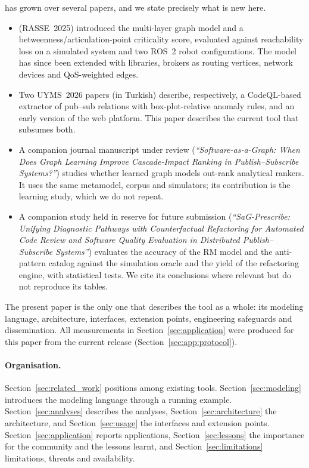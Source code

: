 \sag{} has grown over several papers, and we state precisely what is new here.
\begin{itemize}\tightlist
  \item \citet{yigit2025graph} (RASSE~2025) introduced the multi-layer graph model and a betweenness/articulation-point criticality score, evaluated against reachability loss on a simulated system and two ROS~2 robot configurations. The model has since been extended with libraries, brokers as routing vertices, network devices and QoS-weighted edges.
  \item Two UYMS~2026 papers \citep{caliskan2026uyms, ersen2026uyms} (in Turkish) describe, respectively, a CodeQL-based extractor of pub--sub relations with box-plot-relative anomaly rules, and an early version of the web platform. This paper describes the current tool that subsumes both.
  \item A companion journal manuscript under review (\emph{``Software-as-a-Graph: When Does Graph Learning Improve Cascade-Impact Ranking in Publish--Subscribe Systems?''}) studies whether learned graph models out-rank analytical rankers. It uses the same metamodel, corpus and simulators; its contribution is the learning study, which we do not repeat.
  \item A companion study held in reserve for future submission (\emph{``SaG-Prescribe: Unifying Diagnostic Pathways with Counterfactual Refactoring for Automated Code Review and Software Quality Evaluation in Distributed Publish--Subscribe Systems''}) evaluates the accuracy of the RM model and the anti-pattern catalog against the simulation oracle and the yield of the refactoring engine, with statistical tests. We cite its conclusions where relevant but do not reproduce its tables.
\end{itemize}
The present paper is the only one that describes the tool as a whole: its modeling language, architecture, interfaces, extension points, engineering safeguards and dissemination. All measurements in Section~\ref{sec:application} were produced for this paper from the current release (Section~\ref{sec:app:protocol}).

\paragraph{Organisation.} Section~\ref{sec:related_work} positions \sag{} among existing tools. Section~\ref{sec:modeling} introduces the modeling language through a running example. Section~\ref{sec:analyses} describes the analyses, Section~\ref{sec:architecture} the architecture, and Section~\ref{sec:usage} the interfaces and extension points. Section~\ref{sec:application} reports applications, Section~\ref{sec:lessons} the importance for the community and the lessons learnt, and Section~\ref{sec:limitations} limitations, threats and availability.

